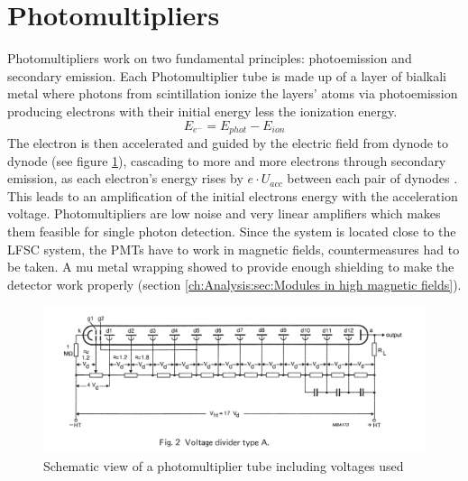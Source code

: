   \section{Photomultipliers}
  \label{ch:The muon detection system:sec:Photomultipliers}
  Photomultipliers work on two fundamental principles: photoemission and secondary emission.
  Each Photomultiplier tube is made up of a layer of bialkali metal where photons from scintillation ionize the layers' atoms via photoemission producing electrons with their initial energy less the ionization energy.
  $$E_{e^-} = E_{phot} - E_{ion}$$
  The electron is then accelerated and guided by the electric field from dynode to dynode (see figure \ref{fig:PMT}), cascading to more and more electrons through secondary emission, as each electron's energy rises by $e\cdot U_{acc}$ between each pair of dynodes \cite{photomultiplier}. This leads to an amplification of the initial electrons energy with the acceleration voltage. Photomultipliers are low noise and very linear amplifiers which makes them feasible for single photon detection. Since the system is located close to the LFSC system, the PMTs have to work in magnetic fields, countermeasures had to be taken. A mu metal wrapping showed to provide enough shielding to make the detector work properly (section \ref{ch:Analysis:sec:Modules in high magnetic fields}).
  \begin{figure}
  	\centering
  	\includegraphics[width =  \textwidth]{graphics/setup/PMT.png}
  	\caption[Photomultiplier tube]{Schematic view of a photomultiplier tube including voltages used  }
  	\label{fig:PMT}
  \end{figure}

  
  
